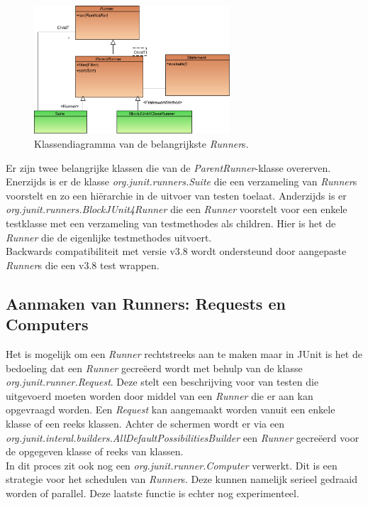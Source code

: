 \documentclass[i1]{oss}
\begin{document}
\begin{figure}[hb!]
	\centering
	\includegraphics[width=0.65\textwidth]{ClassDiagramRunner}
	\caption{Klassendiagramma van de belangrijkste \emph{Runner}s.}
	\label{fig:diagrams:Runner}
\end{figure}

Er zijn twee belangrijke klassen die van de \emph{ParentRunner}-klasse overerven. Enerzijds is er de klasse \emph{org.junit.runners.Suite} die een verzameling van \emph{Runner}s voorstelt en zo een hi\"erarchie in de uitvoer van testen toelaat. Anderzijds is er \emph{org.junit.runners.BlockJUnit4Runner} die een \emph{Runner} voorstelt voor een enkele testklasse met een verzameling van testmethodes als children. Hier is het de \emph{Runner} die de eigenlijke testmethodes uitvoert.\\

Backwards compatibiliteit met versie v3.8 wordt ondersteund door aangepaste \emph{Runner}s die een v3.8 test wrappen.

\subsection{Aanmaken van Runners: Requests en Computers}

Het is mogelijk om een \emph{Runner} rechtstreeks aan te maken maar in JUnit is het de bedoeling dat een \emph{Runner} gecre\"eerd wordt met behulp van de klasse \emph{org.junit.runner.Request}. Deze stelt een beschrijving voor van testen die uitgevoerd moeten worden door middel van een \emph{Runner} die er aan kan opgevraagd worden. Een \emph{Request} kan aangemaakt worden vanuit een enkele klasse of een reeks klassen. Achter de schermen wordt er via een \emph{org.junit.interal.builders.AllDefaultPossibilitiesBuilder} een \emph{Runner} gecre\"eerd voor de opgegeven klasse of reeks van klassen.\\

In dit proces zit ook nog een \emph{org.junit.runner.Computer} verwerkt. Dit is een strategie voor het schedulen van \emph{Runner}s. Deze kunnen namelijk serieel gedraaid worden of parallel. Deze laatste functie is echter nog experimenteel.\\
\end{document}
